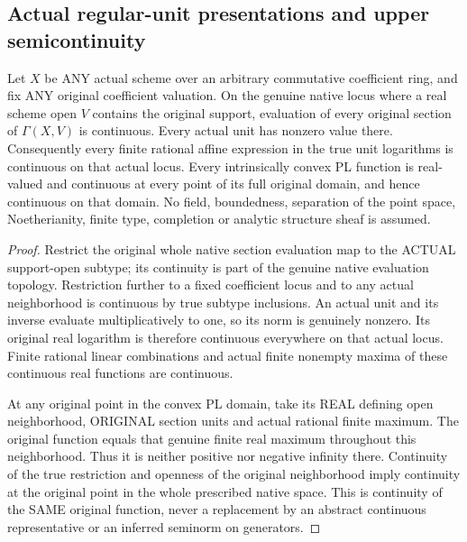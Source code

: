 \subsection{Actual regular-unit presentations and upper semicontinuity}

\begin{lemma}
\label{scheme:actual-native-unit-convex-pl-continuity}
\leanok
{}
Let $X$ be ANY actual scheme over an arbitrary commutative coefficient ring,
and fix ANY original coefficient valuation. On the genuine native locus where
a real scheme open $V$ contains the original support, evaluation of every
original section of $\Gamma(X,V)$ is continuous. Every actual unit has nonzero
value there. Consequently every finite rational affine expression in the true
unit logarithms is continuous on that actual locus. Every intrinsically convex
PL function is real-valued and continuous at every point of its full original
domain, and hence continuous on that domain.
No field, boundedness, separation of the point space, Noetherianity, finite
type, completion or analytic structure sheaf is assumed.
\end{lemma}
\begin{proof}
Restrict the original whole native section evaluation map to the ACTUAL
support-open subtype; its continuity is part of the genuine native evaluation
topology. Restriction further to a fixed coefficient locus and to any actual
neighborhood is continuous by true subtype inclusions. An actual unit and its
inverse evaluate multiplicatively to one, so its norm is genuinely nonzero.
Its original real logarithm is therefore continuous everywhere on that actual
locus. Finite rational linear combinations and actual finite nonempty maxima
of these continuous real functions are continuous.

At any original point in the convex PL domain, take its REAL defining open
neighborhood, ORIGINAL section units and actual rational finite maximum.
The original function equals that genuine finite real maximum throughout this
neighborhood. Thus it is neither positive nor negative infinity there.
Continuity of the true restriction and openness of the original neighborhood
imply continuity at the original point in the whole prescribed native space.
This is continuity of the SAME original function, never a replacement by an
abstract continuous representative or an inferred seminorm on generators.
\end{proof}

